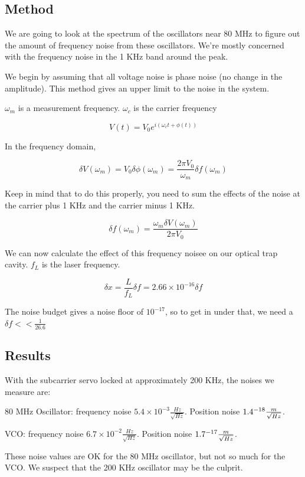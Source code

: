 \subsection{Method}

We are going to look at the spectrum of the oscillators near 80 MHz to figure out the amount of frequency noise from these oscillators.  We're mostly concerned with the frequency noise in the 1 KHz band around the peak.

We begin by assuming that all voltage noise is phase noise (no change in the amplitude).  This method gives an upper limit to the noise in the system.

$\omega_m$ is a measurement frequency.  $\omega_c$ is the carrier frequency

$$V(t) = V_0 e^{i(\omega_c t + \phi(t))}$$

In the frequency domain,

$$\delta V(\omega_m) = V_0 \delta \phi(\omega_m) = \frac{2\pi V_0}{\omega_m} \delta f(\omega_m)$$

Keep in mind that to do this properly, you need to sum the effects of the noise at the carrier plus 1 KHz and the carrier minus 1 KHz.


$$\delta f(\omega_m)= \frac{\omega_m \delta V(\omega_m)}{2 \pi V_0} $$

We can now calculate the effect of this frequency noisee on our optical trap cavity.  $f_L$ is the laser frequency.

$$\delta x = \frac{L}{f_L} \delta f = 2.66\times10^{-16} \delta f$$

The noise budget gives a noise floor of $10^{-17}$, so to get in under that, we need a $\delta f <<\frac{1}{26.6}$


\subsection{Results}

With the subcarrier servo locked at approximately 200 KHz, the noises we measure are:

80 MHz Oscillator: frequency noise $5.4\times10^{-3} \frac{Hz}{\sqrt{Hz}}$.  Position noise $1.4\time10^{-18} \frac{m}{\sqrt{Hz}}$.

VCO: frequency noise $6.7\times10^{-2} \frac{Hz}{\sqrt{Hz}}$.  Position noise $1.7\time10^{-17} \frac{m}{\sqrt{Hz}}$.

These noise values are OK for the 80 MHz oscillator, but not so much for the VCO.  We suspect that the 200 KHz oscillator may be the culprit.


